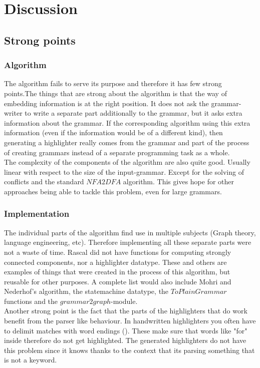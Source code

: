 
\chapter{Discussion} %

\label{chap:discussion} %

\section{Strong points}
\subsection{Algorithm}
The algorithm fails to serve its purpose and therefore it has few strong points.The things that are strong about the algorithm is that the way of embedding information is at the right position. It does not ask the grammar-writer to write a separate part additionally to the grammar, but it asks extra information about the grammar. If the corresponding algorithm using this extra information (even if the information would be of a different kind), then generating a highlighter really comes from the grammar and part of the process of creating grammars instead of a separate programming task as a whole.\\
The complexity of the components of the algorithm are also quite good. Usually linear with respect to the size of the input-grammar. Except for the solving of conflicts and the standard $NFA2DFA$ algorithm. This gives hope for other approaches being able to tackle this problem, even for large grammars.

\subsection{Implementation}
The individual parts of the algorithm find use in multiple subjects (Graph theory, language engineering, etc). Therefore implementing all these separate parts were not a waste of time. Rascal did not have functions for computing strongly connected components, nor a highlighter datatype. These and others are examples of things that were created in the process of this algorithm, but reusable for other purposes. A complete list would also include Mohri and Nederhof's algorithm, the statemachine datatype, the $ToPlainGrammar$ functions and the $grammar2graph$-module.\\
Another strong point is the fact that the parts of the highlighters that do work benefit from the parser like behaviour. In handwritten highlighters you often have to delimit matches with word endings (\data{\\b}). These make sure that words like "for" inside therefore do not get highlighted. The generated highlighters do not have this problem since it knows thanks to the context that its parsing something that is not a keyword.

